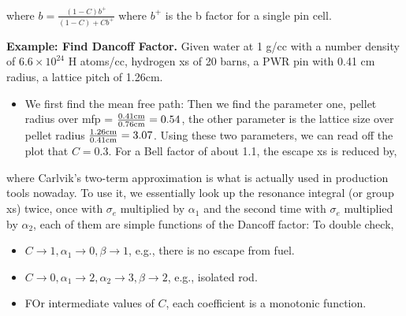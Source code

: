 \documentclass{school-22.211-notes}
\begin{document}
where $b = \frac{(1-C)b^+}{(1-C) + C b^+}$ where $b^+$ is the b factor for a single pin cell. 

\textbf{Example: Find Dancoff Factor.} Given water at 1 g/cc with a number density of $6.6 \times 10^{24}$ H atoms/cc, hydrogen xs of 20 barns, a PWR pin with 0.41 cm radius, a lattice pitch of 1.26cm. 
\begin{itemize}
\item We first find the mean free path: 
Then we find the parameter one, pellet radius over mfp = $\frac{0.41 \mathrm{cm}}{0.76 \mathrm{cm}}  = 0.54$, the other parameter is the lattice size over pellet radius $\frac{1.26 \mathrm{cm}}{0.41 \mathrm{cm}} = 3.07$. Using these two parameters, we can read off the plot that $C = 0.3$. For a Bell factor of about 1.1, the escape xs is reduced by,
\end{itemize}


\clearpage
{}
where
Carlvik's two-term approximation is what is actually used in production tools nowaday. To use it, we essentially look up the resonance integral (or group xs) twice, once with $\sigma_e$ multiplied by $\alpha_1$ and the second time with $\sigma_e$ multiplied by $\alpha_2$, each of them are simple functions of the Dancoff factor: 
To double check, 
\begin{itemize}
\item $C\to 1, \alpha_1 \to 0, \beta \to 1$, e.g., there is no escape from fuel.
\item $C\to 0, \alpha_1 \to 2, \alpha_2 \to 3, \beta \to 2$, e.g., isolated rod.
\item FOr intermediate values of $C$, each coefficient is a monotonic function.
\end{itemize}
\end{document}
